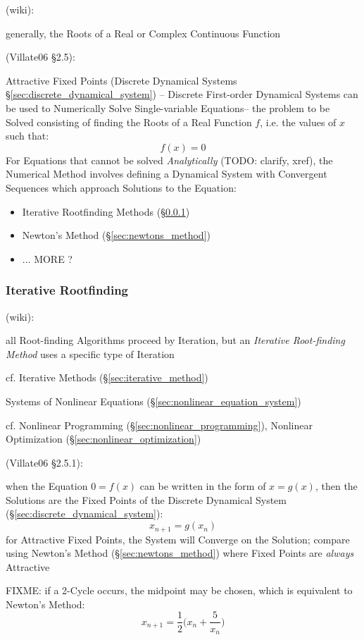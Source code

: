 {(wiki):

generally, the Roots of a Real or Complex Continuous Function

(Villate06 \S 2.5):

Attractive Fixed Points (Discrete Dynamical Systems
\S\ref{sec:discrete_dynamical_system}) --
Discrete First-order Dynamical Systems can be used to Numerically Solve
Single-variable Equations-- the problem to be Solved consisting of finding the
Roots of a Real Function $f$, i.e. the values of $x$ such that:
\[
  f(x) = 0
\]
For Equations that cannot be solved \emph{Analytically} (TODO: clarify, xref),
the Numerical Method involves defining a Dynamical System with Convergent
Sequences which approach Solutions to the Equation:
\begin{itemize}
  \item Iterative Rootfinding Methods (\S\ref{sec:iterative_rootfinding})
  \item Newton's Method (\S\ref{sec:newtons_method})
  \item ... MORE ?
\end{itemize}



\subsubsection{Iterative Rootfinding}\label{sec:iterative_rootfinding}

(wiki):

all Root-finding Algorithms proceed by Iteration, but an \emph{Iterative
  Root-finding Method} uses a specific type of Iteration

\fist cf. Iterative Methods (\S\ref{sec:iterative_method})

\fist Systems of Nonlinear Equations
(\S\ref{sec:nonlinear_equation_system})

\fist cf. Nonlinear Programming (\S\ref{sec:nonlinear_programming}), Nonlinear
Optimization (\S\ref{sec:nonlinear_optimization})

(Villate06 \S 2.5.1):

when the Equation $0 = f(x)$ can be written in the form of $x = g(x)$, then the
Solutions are the Fixed Points of the Discrete Dynamical System
(\S\ref{sec:discrete_dynamical_system}):
\[
  x_{n+1} = g(x_n)
\]
for Attractive Fixed Points, the System will Converge on the Solution; compare
using Newton's Method (\S\ref{sec:newtons_method}) where Fixed Points are
\emph{always} Attractive

FIXME:
if a 2-Cycle occurs, the midpoint may be chosen, which is equivalent to Newton's
Method:
\[
  x_{n+1} = \frac{1}{2}\big(x_n + \frac{5}{x_n}\big)
\]



}
